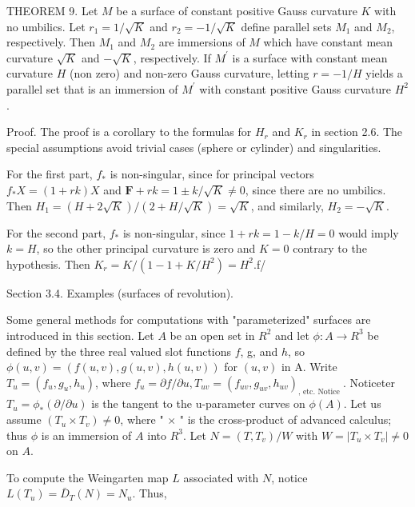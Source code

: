 \documentclass[10pt]{article}
\begin{document}
THEOREM 9. Let $M$ be a surface of constant positive Gauss curvature $K$ with no umbilics. Let $r_{1}=1 / \sqrt{K}$ and $r_{2}=-1 / \sqrt{K}$ define parallel sets $M_{1}$ and $M_{2}$, respectively. Then $M_{1}$ and $M_{2}$ are immersions of $M$ which have constant mean curvature $\sqrt{K}$ and $-\sqrt{K}$, respectively. If $M^{\prime}$ is a surface with constant mean curvature $H$ (non zero) and non-zero Gauss curvature, letting $r=-1 / H$ yields a parallel set that is an immersion of $M^{\prime}$ with constant positive Gauss curvature $H^{2}$.

Proof. The proof is a corollary to the formulas for $H_{r}$ and $K_{r}$ in section 2.6. The special assumptions avoid trivial cases (sphere or cylinder) and singularities.

For the first part, $f_{*}$ is non-singular, since for principal vectors $f_{*} X=(1+r k) X$ and $\mathbf{F}+r k=1 \pm k / \sqrt{K} \neq 0$, since there are no umbilics. Then $H_{1}=(H+2 \sqrt{K}) /(2+H / \sqrt{K})=\sqrt{K}$, and similarly, $H_{2}=-\sqrt{K}$.

For the second part, $f_{*}$ is non-singular, since $1+r k=1-k / H=0$ would imply $k=H$, so the other principal curvature is zero and $K=0$ contrary to the hypothesis. Then $K_{r}=K /\left(1-1+K / H^{2}\right)=H^{2}$.f/

Section 3.4. Examples (surfaces of revolution).

Some general methods for computations with "parameterized" surfaces are introduced in this section. Let $A$ be an open set in $R^{2}$ and let $\phi: A \rightarrow R^{3}$ be defined by the three real valued slot functions $f$, g, and $h$, so $\phi(u, v)=(f(u, v), g(u, v), h(u, v))$ for $(u, v)$ in A. Write $T_{u}=\left(f_{u}, g_{u}, h_{u}\right)$, where $f_{u}=\partial f / \partial u, T_{u v}=\left(f_{u v}, g_{u v}, h_{u v}\right)_{\text {, etc. Notice }}$. Noticeter $T_{u}=\phi_{*}(\partial / \partial u)$ is the tangent to the u-parameter curves on $\phi(A)$. Let us assume $\left(T_{u} \times T_{v}\right) \neq 0$, where " $\times$ " is the cross-product of advanced calculus; thus $\phi$ is an immersion of $A$ into $R^{3}$. Let $N=\left(T, T_{v}\right) / W$ with $W=\left|T_{u} \times T_{v}\right| \neq 0$ on $A$.

To compute the Weingarten map $L$ associated with $N$, notice $L\left(T_{u}\right)=\bar{D}_{T}(N)=N_{u}$. Thus,
\end{document}
